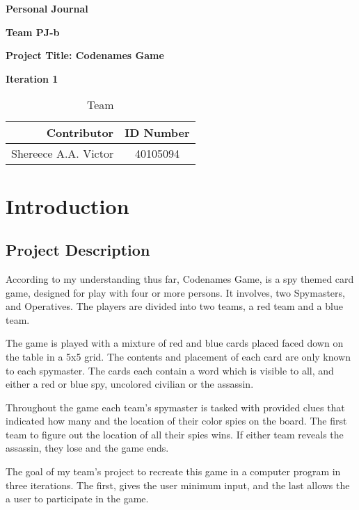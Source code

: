 \documentclass[12pt]{article}
\begin{document}
\vspace*{0.5in}
\centerline{\bf\Large Personal Journal}
\vspace*{0.5in}
\centerline{\bf\Large Team PJ-b}
\vspace*{0.5in}
\centerline{\bf\Large Project Title: Codenames Game }
\vspace*{0.25in}
\centerline{\bf\Large Iteration 1}


\vspace*{2in}
\begin{table}[htbp]
\caption{Team}
\begin{center}
\begin{tabular}{|r | c|}
\hline
Contributor & ID Number \\
\hline\hline
Shereece A.A. Victor  & 40105094  \\
\hline
\end{tabular}
\end{center}
\end{table}

\clearpage
\section{Introduction}

\subsection{Project Description}
According to my understanding thus far, Codenames Game, is a spy themed card game, designed for play with four or more persons. It involves, two Spymasters, and Operatives. The players are divided into two teams, a red team and a blue team. 

The game is played with a mixture of red and blue cards placed faced down on the table in a 5x5 grid. The contents and placement of each card are only known to each spymaster. The cards each contain a word which is visible to all, and either a red or blue spy, uncolored civilian or the assassin. 

Throughout the game each team’s spymaster is tasked with provided clues that indicated how many and the location of their color spies on the board. The first team to figure out the location of all their spies wins. If either team reveals the assassin, they lose and the game ends. 

The goal of my team’s project to recreate this game in a computer program in three iterations. The first, gives the user minimum input, and the last allows the a user to participate in the game. 
\end{document}
